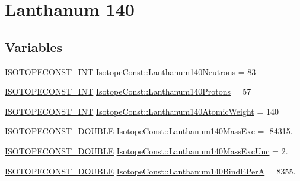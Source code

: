 \hypertarget{group___isotope_const-_lanthanum-_la140}{}\section{Lanthanum 140}
\label{group___isotope_const-_lanthanum-_la140}
\subsection*{Variables}
\begin{DoxyCompactItemize}
\item 
\mbox{\hyperlink{group___isotope_const-_macros_ga5f18360b3e99483a35c32d789e62621c}{I\+S\+O\+T\+O\+P\+E\+C\+O\+N\+S\+T\+\_\+\+I\+NT}} \mbox{\hyperlink{group___isotope_const-_lanthanum-_la140_ga644c96831025513654b0e856678a8491}{Isotope\+Const\+::\+Lanthanum140\+Neutrons}} = 83
\item 
\mbox{\hyperlink{group___isotope_const-_macros_ga5f18360b3e99483a35c32d789e62621c}{I\+S\+O\+T\+O\+P\+E\+C\+O\+N\+S\+T\+\_\+\+I\+NT}} \mbox{\hyperlink{group___isotope_const-_lanthanum-_la140_gab68fd70bfcaccbbb7fe83f1f9bb7c3b2}{Isotope\+Const\+::\+Lanthanum140\+Protons}} = 57
\item 
\mbox{\hyperlink{group___isotope_const-_macros_ga5f18360b3e99483a35c32d789e62621c}{I\+S\+O\+T\+O\+P\+E\+C\+O\+N\+S\+T\+\_\+\+I\+NT}} \mbox{\hyperlink{group___isotope_const-_lanthanum-_la140_gad8c1ad88346ee94d51ac9620a9d1da1b}{Isotope\+Const\+::\+Lanthanum140\+Atomic\+Weight}} = 140
\item 
\mbox{\hyperlink{group___isotope_const-_macros_ga8f45a7272ce02c0b4c65c44636ed719a}{I\+S\+O\+T\+O\+P\+E\+C\+O\+N\+S\+T\+\_\+\+D\+O\+U\+B\+LE}} \mbox{\hyperlink{group___isotope_const-_lanthanum-_la140_gaa18f9aed9b945005e714fafc8e7676b2}{Isotope\+Const\+::\+Lanthanum140\+Mass\+Exc}} = -\/84315.
\item 
\mbox{\hyperlink{group___isotope_const-_macros_ga8f45a7272ce02c0b4c65c44636ed719a}{I\+S\+O\+T\+O\+P\+E\+C\+O\+N\+S\+T\+\_\+\+D\+O\+U\+B\+LE}} \mbox{\hyperlink{group___isotope_const-_lanthanum-_la140_ga6026f3eb7a5e61f1182ff180a0fcc2fd}{Isotope\+Const\+::\+Lanthanum140\+Mass\+Exc\+Unc}} = 2.
\item 
\mbox{\hyperlink{group___isotope_const-_macros_ga8f45a7272ce02c0b4c65c44636ed719a}{I\+S\+O\+T\+O\+P\+E\+C\+O\+N\+S\+T\+\_\+\+D\+O\+U\+B\+LE}} \mbox{\hyperlink{group___isotope_const-_lanthanum-_la140_ga4c8c00d704b5afc7bcbfe96278c2b3ef}{Isotope\+Const\+::\+Lanthanum140\+Bind\+E\+PerA}} = 8355.
\item 

\end{DoxyCompactItemize}
